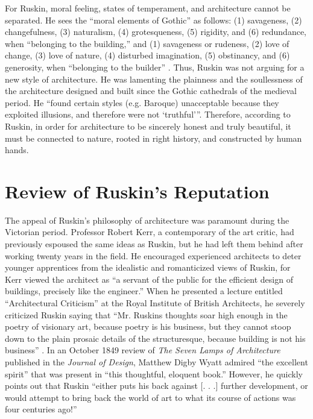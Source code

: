 For Ruskin, moral feeling, states of temperament, and architecture
cannot be separated.  He sees the ``moral elements of Gothic'' as
follows: (1) savageness, (2) changefulness, (3) naturalism, (4)
grotesqueness, (5) rigidity, and (6) redundance, when “belonging to the
building,” and (1) savageness or rudeness, (2) love of change, (3) love
of nature, (4) disturbed imagination, (5) obstinancy, and (6)
generosity, when “belonging to the builder” \citep[][pp.~155]{ruskin1885}
.  Thus, Ruskin was not arguing for a new style of architecture. 
He was lamenting the plainness and the soullessness of the architecture
designed and built since the Gothic cathedrals of the medieval period. 
He “found certain
styles (e.g. Baroque) unacceptable because they exploited illusions,
and therefore were not `truthful'”\citep[][pp.~669]{curl2006}.
Therefore, according to Ruskin, in order for architecture
to be sincerely honest and truly beautiful, it must be connected to
nature, rooted in right history, and constructed by human hands.  

\section{Review of Ruskin's Reputation}


The appeal of Ruskin’s philosophy of architecture was paramount during
the Victorian period.  Professor Robert Kerr, a contemporary of the art
critic, had previously espoused the same ideas as Ruskin, but he had
left them behind after working twenty years in the field.  He
encouraged experienced architects to deter younger apprentices from the
idealistic and romanticized views of Ruskin, for Kerr viewed the
architect as “a servant of the public for the efficient design of
buildings, precisely like the engineer.”  When he presented a lecture
entitled ``Architectural Criticism'' at the
Royal Institute of British Architects, he severely criticized Ruskin
saying that “Mr. Ruskin{\textquotesingle}s thoughts soar high enough in
the poetry of visionary art, because poetry is his business, but they
cannot stoop down to the plain prosaic details of the structuresque,
because building is not his business” \citep[][pp.~259--260]{collins1998}.  In an
October 1849 review of \textit{The Seven Lamps of Architecture
}published in the \textit{Journal of Design}, Matthew Digby Wyatt
admired “the excellent spirit” that was present in “this thoughtful,
eloquent book.”  However, he quickly points out that Ruskin “either
puts his back against  [. . .] further development, or would attempt to
bring back the world of art to what its course of actions was four
centuries ago!”\citep[][pgs. 121, 438]{mallgrave2009}

